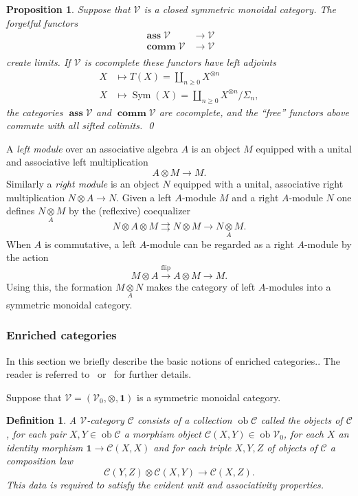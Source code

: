 \documentclass{amsart}
\newtheorem{prop}[equation]{Proposition}
\newtheorem{definition}[equation]{Definition}
\newenvironment{defin}{\begin{definition}\rm}{\end{definition}}
\theoremstyle{definition}
\newtheorem{defin}[equation]{Definition}
\theoremstyle{remark}
\DeclareMathOperator{\sym}{Sym}
\newcommand{\cat}[1]{{\mathcal #1}}
\DeclareMathOperator{\comm}{\mathbf{comm}}
\DeclareMathOperator{\ass}{\mathbf{ass}}
\newcommand{\commcat}[1]{\comm\cat #1}
\newcommand{\asscat}[1]{\ass\cat #1}
\newcommand{\one}{\mathbf{1}}
\DeclareMathOperator{\ob}{ob}
\newcommand{\tensove}[1]{\underset{#1}{\otimes}}
\begin{document}
\begin{prop}
\label{thm:1}
Suppose that $\cat V$ is a closed symmetric monoidal category.  The
forgetful functors 
\begin{align*}
\asscat V &\to \cat V \\
\commcat V &\to \cat V \\
\end{align*}
create limits.  If $\cat V$ is cocomplete these functors have left
adjoints
\begin{align*}
X &\mapsto T(X) = \coprod_{n\ge 0} X^{\otimes n} \\
X &\mapsto \sym (X) = \coprod_{n\ge 0} X^{\otimes n}/\Sigma_{n},
\end{align*}
the categories $\asscat V$ and $\commcat V$ are cocomplete, and the
``free'' functors above commute with all sifted colimits.   \qed
\end{prop}

A {\em left module} over an associative algebra $A$ is an object $M$
equipped with a unital and associative left multiplication 
\[
A\otimes M\to M.
\]
Similarly a {\em right module} is an object $N$ equipped with a
unital, associative right multiplication $N\otimes A\to N$.   Given a
left $A$-module $M$ and a right $A$-module $N$ one defines
$N\tensove{A} M$ by the (reflexive) coequalizer
\[
N\otimes A\otimes M\rightrightarrows N\otimes M\rightarrow N\tensove{A}M.
\]
When $A$ is commutative, a left $A$-module can be regarded as a right
$A$-module by the action 
\[
M\otimes A\xrightarrow{\text{flip}}{} A\otimes M \to M.
\]
Using this, the formation $M\tensove{A}N$ makes the category of left
$A$-modules into a symmetric monoidal category.

\subsubsection{Enriched categories}
\label{sec:enriched-categories}

In this section we briefly describe the basic notions of enriched
categories..  The reader is referred to~\cite{Kelly:Enr}
or~\cite[Ch.~6]{borceux2} for further details.

Suppose that $\cat V = (\cat V_{0},\otimes,\one)$ is a symmetric monoidal
category.  

\begin{defin}
\label{def:33} A $\cat V$-category $\cat C$ consists of a collection
$\ob \cat C$ called the {\em objects} of $\cat C$, for each pair
$X,Y\in\ob\cat C$ a {\em morphism object} $\cat C(X,Y)\in \ob \cat
V_{0}$, for each $X$ an {\em identity morphism} $\one \to \cat C(X,X)$
and for each triple $X,Y,Z$ of objects of $\cat C$ a {\em composition
law}
\[
\cat C(Y,Z)\otimes \cat C(X,Y)\to \cat C(X,Z).
\]
This data is required to satisfy the evident unit and associativity
properties.
\end{defin}
\end{document}
